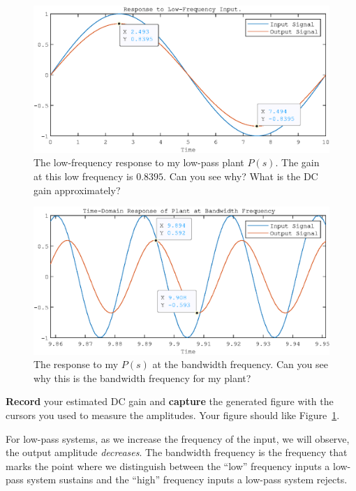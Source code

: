 \begin{figure}
  \includegraphics{images/Lab_1_LowFrequency.eps}
  \caption{The low-frequency response to my low-pass plant \(P(s).\) The gain
  at this low frequency is \(0.8395.\) Can you see why? What is the DC
  gain approximately?}
  \label{fig:lab1:lowfreq}
\end{figure}
%
\begin{figure}
  \includegraphics{images/Lab_1_Bandwidth.eps}
  \caption{The response to my \(P(s)\) at the bandwidth frequency.
  Can you see why this is the bandwidth frequency for my plant?}
  \label{fig:lab1:bandwidth}
\end{figure}
%
\begin{deliverable}[label={lab1:d1}]
  \textbf{Record} your estimated DC gain and \textbf{capture} the generated
  figure with the cursors you used to measure the amplitudes.
  Your figure should like Figure~\ref{fig:lab1:lowfreq}.
\end{deliverable}
%
For low-pass systems, as we increase the frequency of the input, we will
observe, the output amplitude \emph{decreases}. The bandwidth frequency
is the frequency that marks the point where we distinguish between the
``low'' frequency inputs a low-pass system sustains and the ``high'' frequency
inputs a low-pass system rejects.
